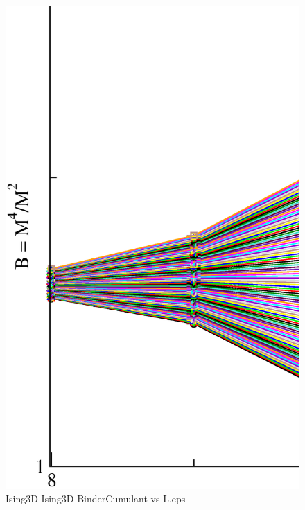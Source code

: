 \begin{figure}[!htpb]
  \centering
  \includegraphics[width=\textwidth]{./plots/Ising3D/Ising3D_BinderCumulant_vs_L.eps}
  \caption{Ising3D Ising3D BinderCumulant vs L.eps}
\end{figure}

